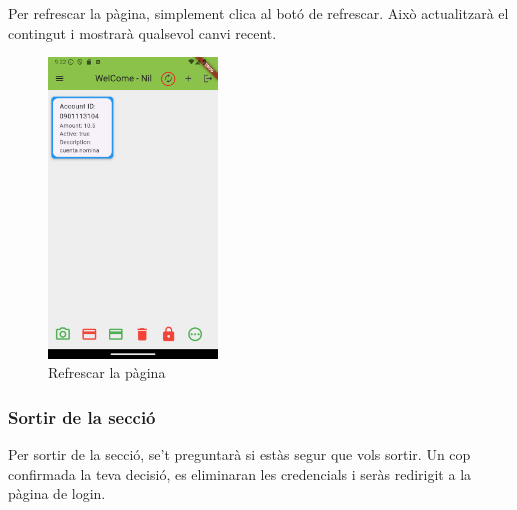 \documentclass[a4paper,12pt,twoside]{ThesisStyle}
\begin{document}
Per refrescar la pàgina, simplement clica al botó de refrescar. Això actualitzarà el contingut i mostrarà qualsevol canvi recent.

\begin{figure}[h]
    \centering
    \includegraphics[width=0.4\textwidth]{imatges/mainpageAccount7.png}
    \caption{Refrescar la pàgina}
    \label{fig:Refrescar la pàgina}
\end{figure}

\clearpage
\subsubsection{Sortir de la secció}
\label{subsubsec:Sortir de la secció}

Per sortir de la secció, se't preguntarà si estàs segur que vols sortir. Un cop confirmada la teva decisió, es eliminaran les credencials i seràs redirigit a la pàgina de login.
\end{document}
